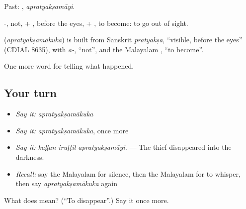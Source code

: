 Past: , \emph{apratyakṣamāyi}.

-, not, + , before the eyes, + , to become: to go out of sight.

\begin{cousinweb}
\textbf{} (\emph{apratyakṣamākuka}) is built from Sanskrit \emph{pratyakṣa}, \textquotedblleft{}visible, before the eyes\textquotedblright{} (CDIAL 8635), with \emph{a-}, \textquotedblleft{}not\textquotedblright{}, and the Malayalam , \textquotedblleft{}to become\textquotedblright{}.
\end{cousinweb}

\begin{grammarlens}[title={What you've built}]
One more word for telling what happened.
\end{grammarlens}

\subsection*{Your turn}
\begin{itemize}
\raggedright
  \item \emph{Say it:} \emph{apratyakṣamākuka}
  \item \emph{Say it:} \emph{apratyakṣamākuka}, once more
  \item \emph{Say it:} \emph{kaḷḷan iruṭṭil apratyakṣamāyi.} — The thief disappeared into the darkness.
  \item \emph{Recall:} say the Malayalam for silence, then the Malayalam for to whisper, then say \emph{apratyakṣamākuka} again
\end{itemize}

\begin{tcolorbox}[breakable,colback=teal!4,colframe=teal!35!black,title={Before you move on}]
What does  mean? (\textquotedblleft{}To disappear\textquotedblright{}.) Say it once more.
\end{tcolorbox}
